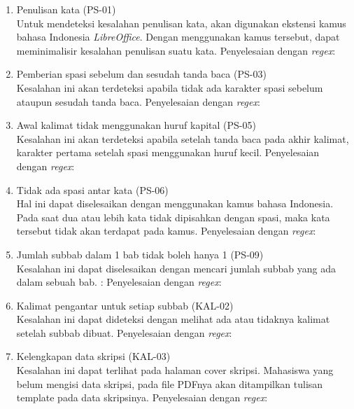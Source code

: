 \begin{enumerate}
	\item Penulisan kata (PS-01) \\
	Untuk mendeteksi kesalahan penulisan kata, akan digunakan ekstensi kamus bahasa Indonesia \textit{LibreOffice}. Dengan menggunakan kamus tersebut, dapat meminimalisir kesalahan penulisan suatu kata. \newline
	Penyelesaian dengan \textit{regex}:
	
	\item Pemberian spasi sebelum dan sesudah tanda baca (PS-03) \\
	Kesalahan ini akan terdeteksi apabila tidak ada karakter spasi sebelum ataupun sesudah tanda baca.
	Penyelesaian dengan \textit{regex}:
	
	\item Awal kalimat tidak menggunakan huruf kapital (PS-05) \\
	Kesalahan ini akan terdeteksi apabila setelah tanda baca pada akhir kalimat, karakter pertama setelah spasi menggunakan huruf kecil.	
	Penyelesaian dengan \textit{regex}:
	
	\item Tidak ada spasi antar kata (PS-06) \\
	Hal ini dapat diselesaikan dengan menggunakan kamus bahasa Indonesia. Pada saat dua atau lebih kata tidak dipisahkan dengan spasi, maka kata tersebut tidak akan terdapat pada kamus. \newline
	Penyelesaian dengan \textit{regex}:
	
	\item Jumlah subbab dalam 1 bab tidak boleh hanya 1 (PS-09) \\
	Kesalahan ini dapat diselesaikan dengan mencari jumlah subbab yang ada dalam sebuah bab. \newline:
	Penyelesaian dengan \textit{regex}:
	
	\item Kalimat pengantar untuk setiap subbab (KAL-02) \\
	Kesalahan ini dapat dideteksi dengan melihat ada atau tidaknya kalimat setelah subbab dibuat. \newline
	Penyelesaian dengan \textit{regex}:
	
	\item Kelengkapan data skripsi (KAL-03) \\
	Kesalahan ini dapat terlihat pada halaman cover skripsi. Mahasiswa yang belum mengisi data skripsi, pada file PDFnya akan ditampilkan tulisan template pada data skripsinya. \newline
	Penyelesaian dengan \textit{regex}:
	

\end{enumerate}
